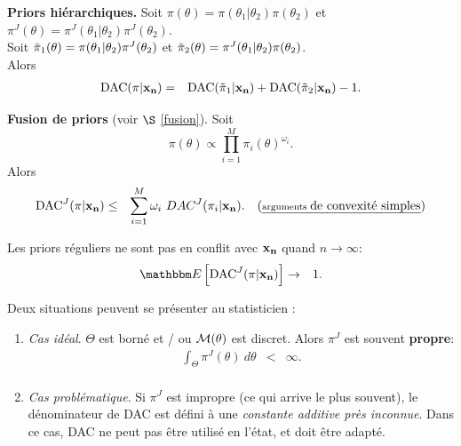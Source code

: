 \begin{proposition}{\bf Priors hiérarchiques.} 
Soit ${\pi(\theta)}  =
{\pi(\theta_1|\theta_2)\pi(\theta_2)}$ et
${\pi^J(\theta)}  =  {\pi^J(\theta_1|\theta_2)\pi^J(\theta_2)}$. \\
Soit 
$\textcolor{black}{\tilde{\pi}_1(\theta)}   = 
{\pi(\theta_1|\theta_2)}{\pi^J(\theta_2)}$ et 
$\textcolor{black}{\tilde{\pi}_2(\theta)} = 
{\pi^J(\theta_1|\theta_2)}{\pi(\theta_2)}$. \\
Alors
\begin{eqnarray*}
 \mbox{DAC}({\pi}|{\bf x_n}) & = &
\mbox{DAC}(\textcolor{black}{\tilde{\pi}_1}|{\bf x_n}) +
\mbox{DAC}(\textcolor{black}{\tilde{\pi}_2}|{\bf x_n}) -1.
\end{eqnarray*}
\end{proposition}


\begin{proposition}{{\bf Fusion de priors} (voir $\S$ \ref{fusion}).}
Soit $$\pi(\theta)  \propto  \prod_{i=1}^M \pi_i(\theta)^{\omega_i}.$$ Alors
\begin{eqnarray*}
\mbox{DAC}^J(\pi|{\bf x_n}) &  \leq & \sum\limits_{i=1}^M \omega_i \
DAC^J(\pi_i|{\bf x_n}). \ \ \ \text{(\emph{\scriptsize
arguments de convexité simples})}
\end{eqnarray*}
\end{proposition}


\begin{proposition}
Les priors réguliers ne sont pas en conflit avec ${\bf x_n}$ quand  $n\rightarrow \infty$:
\begin{eqnarray*}
\E\left[\DAC^J(\pi|{\bf x_n})\right] &\rightarrow & 1.
\end{eqnarray*}
\end{proposition}

\noindent Deux situations peuvent se présenter au statisticien :
\begin{enumerate}
\item\emph{\it Cas idéal}. $\Theta$ est borné et / ou 
${\cal{M}}(\theta)$ est discret. Alors $\pi^J$ est souvent  {\bf propre}:
\begin{eqnarray*}
\int_{\Theta} \pi^J(\theta) \ d\theta & < & \infty.\\
\end{eqnarray*}
\item\emph{\it Cas problématique}.  Si $\pi^J$ est impropre
 (ce qui arrive le plus souvent), le dénominateur de  DAC est défini à une 
\emph{\it
constante additive près inconnue}. Dans ce cas,  DAC ne peut pas être utilisé en l'état, et doit être adapté. \\
\end{enumerate}

